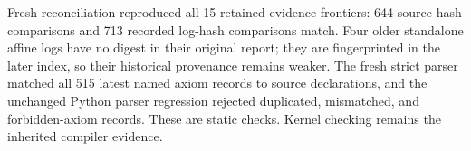 Fresh reconciliation reproduced all 15 retained evidence frontiers: 644 source-hash comparisons and 713 recorded log-hash comparisons match. Four older standalone affine logs have no digest in their original report; they are fingerprinted in the later index, so their historical provenance remains weaker. The fresh strict parser matched all 515 latest named axiom records to source declarations, and the unchanged Python parser regression rejected duplicated, mismatched, and forbidden-axiom records. These are static checks. Kernel checking remains the inherited compiler evidence.
